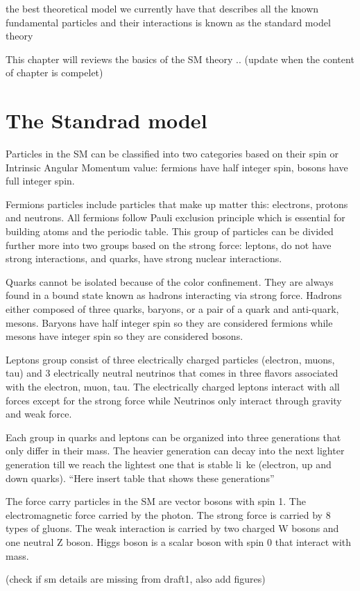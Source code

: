 
the best theoretical model we currently have that describes all the known fundamental particles and their interactions is known as the standard model theory 

This chapter will reviews the basics of the SM theory .. (update when the content of chapter is compelet)

\section{The Standrad model}

Particles in the SM can be classified into two categories based on their spin or Intrinsic Angular Momentum value: fermions have half integer spin, bosons have full integer spin.

Fermions particles include particles that make up matter this: electrons, protons and neutrons. All fermions follow Pauli exclusion principle which is essential for building atoms and the periodic table. This group of particles can be divided further more into two groups based on the strong force: leptons, do not have strong interactions, and quarks, have strong nuclear interactions.

Quarks cannot be isolated because of the color confinement. They are always found in a bound state known as hadrons interacting via strong force. Hadrons either composed of three quarks, baryons, or a pair of a quark and anti-quark, mesons. Baryons have half integer spin so they are considered fermions while mesons have integer spin so they are considered bosons.

Leptons group consist of three electrically charged particles (electron, muons, tau) and 3 electrically neutral neutrinos that comes in three flavors associated with the electron, muon, tau. The electrically charged leptons interact with all forces except for the strong force while Neutrinos only interact through gravity and weak force.

Each group in quarks  and leptons can be organized into three generations that only differ in their mass. The heavier generation can decay into the next lighter generation till we reach the lightest one that is stable li\
ke (electron, up and  down quarks). “Here insert table that shows these generations”

The force carry particles in the SM are vector bosons with spin 1. The electromagnetic force carried by the photon. The strong force is carried by 8 types of gluons. The weak interaction is carried by two charged W bosons and one neutral Z boson. Higgs boson is a scalar boson with spin 0 that interact with mass.

(check if sm details are missing from draft1, also add figures)
